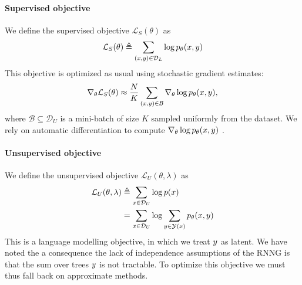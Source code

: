 \paragraph{Supervised objective}
We define the supervised objective $\mathcal{L}_{S}(\theta)$ as
\begin{align*}
  \mathcal{L}_{S}(\theta)
    &\triangleq \sum_{(x, y) \in \mathcal{D}_L} \log p_{\theta} (x, y) \\
\end{align*}
This objective is optimized as usual using stochastic gradient estimates:
\begin{align*}
  \nabla_{\theta} \mathcal{L}_{S}(\theta)
    &\approx \frac{N}{K} \sum_{(x, y) \in \mathcal{B}} \nabla_{\theta} \log p_{\theta} (x, y), \\
\end{align*}
where $\mathcal{B} \subseteq \mathcal{D}_U$ is a mini-batch of size $K$ sampled uniformly from the dataset. We rely on automatic differentiation to compute $\nabla_{\theta} \log p_{\theta}(x, y)$ \citep{Baydin+2017:AD}.

\paragraph{Unsupervised objective}
We define the unsupervised objective $\mathcal{L}_{U}(\theta, \lambda)$ as
\begin{align*}
  \mathcal{L}_{U}(\theta, \lambda)
    &\triangleq \sum_{x \in \mathcal{D}_U} \log p (x) \\
    &= \sum_{x \in \mathcal{D}_U} \log \sum_{ y \in \mathcal{Y}(x)} p_{\theta}(x, y)
\end{align*}
This is a language modelling objective, in which we treat $y$ as latent. We have noted the a consequence the lack of independence assumptions of the RNNG is that the sum over trees $y$ is not tractable. To optimize this objective we must thus fall back on approximate methods.

